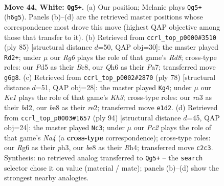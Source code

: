 \documentclass[11pt]{article}
\begin{document}
\clearpage

\begin{figure}[p]\centering
\begin{subfigure}{0.46\textwidth}\centering
\resizebox{\linewidth}{!}{%
\newchessgame
\chessboard[
  setfen={4b3/3nk3/6RQ/3P4/8/r5p1/P1P1p1P1/4K3 w - - 4 44},
  showmover=false,
  pgfstyle=straightmove, color=movearrow, markmove={h6-g5}
]}
\caption{}
\end{subfigure}\hfill
\begin{subfigure}{0.46\textwidth}\centering
\resizebox{\linewidth}{!}{%
\newchessgame
\chessboard[
  setfen={2b5/p7/5k1p/2p5/1P5P/1BP1R3/1K6/3r4 b - - 4 43},
  showmover=false,
  pgfstyle=straightmove, color=movearrow, markmove={d1-d2}
]}
\caption{}
\end{subfigure}
\\[4pt]
\begin{subfigure}{0.46\textwidth}\centering
\resizebox{\linewidth}{!}{%
\newchessgame
\chessboard[
  setfen={5k2/6pp/3N4/7P/4R3/2P2pPK/3br3/8 w - - 2 40},
  showmover=false,
  pgfstyle=straightmove, color=movearrow, markmove={h3-g4}
]}
\caption{}
\end{subfigure}\hfill
\begin{subfigure}{0.46\textwidth}\centering
\resizebox{\linewidth}{!}{%
\newchessgame
\chessboard[
  setfen={4n3/4k3/p1P1p3/K5P1/N6R/1r5p/1P6/8 w - - 3 48},
  showmover=false,
  pgfstyle=straightmove, color=movearrow, markmove={a4-c3}
]}
\caption{}
\end{subfigure}
\caption{\textbf{Move 44, White: \texttt{Qg5+}.} (a) Our position; Melanie plays \texttt{Qg5+} (\texttt{h6g5}). Panels (b)--(d) are the retrieved master positions whose correspondence most drove this move (highest QAP objective among those that transfer to it). (b) Retrieved from \texttt{ccrl\_top\_p0000\#3510} (ply 85) [structural distance $d$=50, QAP obj=30]: the master played \texttt{Rd2+}; under $\mu$ our \emph{Rg6} plays the role of that game's \emph{Rd8}; cross-type roles: our \emph{P}d5 as their \emph{B}c8, our \emph{Q}h6 as their \emph{P}a7; transferred move \texttt{g6g8}. (c) Retrieved from \texttt{ccrl\_top\_p0002\#2870} (ply 78) [structural distance $d$=51, QAP obj=28]: the master played \texttt{Kg4}; under $\mu$ our \emph{Ke1} plays the role of that game's \emph{Kh3}; cross-type roles: our \emph{r}a3 as their \emph{b}d2, our \emph{b}e8 as their \emph{r}e2; transferred move \texttt{e1d2}. (d) Retrieved from \texttt{ccrl\_top\_p0003\#1657} (ply 94) [structural distance $d$=45, QAP obj=24]: the master played \texttt{Nc3}; under $\mu$ our \emph{Pc2} plays the role of that game's \emph{Na4} (a \textbf{cross-type} correspondence); cross-type roles: our \emph{R}g6 as their \emph{p}h3, our \emph{b}e8 as their \emph{R}h4; transferred move \texttt{c2c3}. Synthesis: no retrieved analog transferred to \texttt{Qg5+} -- the \texttt{search} selector chose it on value (material / mate); panels (b)--(d) show the strongest nearby analogies.}
\label{fig:thought-m86}
\end{figure}
\end{document}
